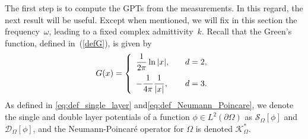 The first step is to compute the GPTs from the measurements. In
this regard, the next result will be useful. Except when
mentioned, we will fix in this section the frequency~$\omega$,
leading to a fixed complex admittivity~$k$. Recall that the Green's function, defined in~(\ref{defG}), is given by
$$
G(x) = \left\{
\begin{array}{ll}
\ds \frac{1}{2\pi} \ln |x|, \quad & d=2 , \\
\nm \ds -\frac{1}{4\pi} \frac{1}{|x|}, \quad & d=3.
\end{array}
\right.
$$
As defined in \eqref{eq:def_single_layer} and\eqref{eq:def_Neumann_Poincare}, we denote the single and double layer potentials of a function
$\phi \in L^2(\partial \Omega)$ as $\mathcal{S}_\Omega[\phi]$ and
$\mathcal{D}_\Omega[\phi]$, and the Neumann-Poincar\'e operator for $\Omega$ is denoted
$\mathcal{K}^*_\Omega$.

